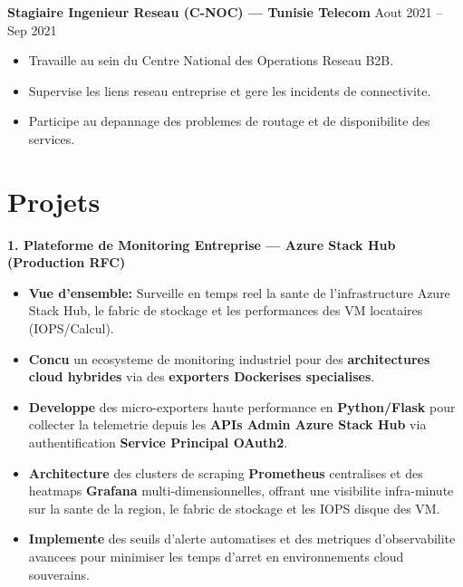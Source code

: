 \documentclass[10pt, letterpaper]{article}
\newenvironment{highlights}{
\begin{itemize}[leftmargin=12pt, itemsep=2pt]
}{
\end{itemize}
}
\begin{document}
\textbf{Stagiaire Ingenieur Reseau (C-NOC) --- Tunisie Telecom} \hfill Aout 2021 -- Sep 2021
\begin{highlights}
\item Travaille au sein du Centre National des Operations Reseau B2B.
\item Supervise les liens reseau entreprise et gere les incidents de connectivite.
\item Participe au depannage des problemes de routage et de disponibilite des services.
\end{highlights}

\section{Projets}

\textbf{1. Plateforme de Monitoring Entreprise --- Azure Stack Hub (Production RFC)}
\begin{highlights}
\item \textbf{Vue d'ensemble:} Surveille en temps reel la sante de l'infrastructure Azure Stack Hub, le fabric de stockage et les performances des VM locataires (IOPS/Calcul).
\item \textbf{Concu} un ecosysteme de monitoring industriel pour des \textbf{architectures cloud hybrides} via des \textbf{exporters Dockerises specialises}.
\item \textbf{Developpe} des micro-exporters haute performance en \textbf{Python/Flask} pour collecter la telemetrie depuis les \textbf{APIs Admin Azure Stack Hub} via authentification \textbf{Service Principal OAuth2}.
\item \textbf{Architecture} des clusters de scraping \textbf{Prometheus} centralises et des heatmaps \textbf{Grafana} multi-dimensionnelles, offrant une visibilite infra-minute sur la sante de la region, le fabric de stockage et les IOPS disque des VM.
\item \textbf{Implemente} des seuils d'alerte automatises et des metriques d'observabilite avancees pour minimiser les temps d'arret en environnements cloud souverains.
\end{highlights}
\end{document}
